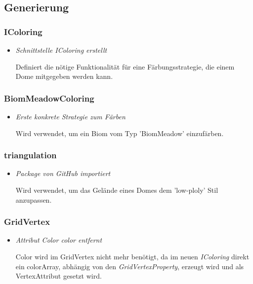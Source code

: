 \subsection{Generierung}

\subsubsection{IColoring}
\begin{itemize}
    \item \textit{Schnittstelle IColoring erstellt}
        \begin{leftbar}[0.9\linewidth]
            Definiert die nötige Funktionalität für eine Färbungsstrategie, die einem Dome mitgegeben werden kann.
        \end{leftbar}
    
\end{itemize}

\subsubsection{BiomMeadowColoring}
\begin{itemize}
    \item \textit{Erste konkrete Strategie zum Färben}
        \begin{leftbar}[0.9\linewidth]
            Wird verwendet, um ein Biom vom Typ 'BiomMeadow' einzufärben.
        \end{leftbar}
    
\end{itemize}

\subsubsection{triangulation}
\begin{itemize}
    \item \textit{Package von GitHub importiert}
        \begin{leftbar}[0.9\linewidth]
            Wird verwendet, um das Gelände eines Domes dem 'low-ploly' Stil anzupassen.
        \end{leftbar}
    
\end{itemize}


\subsubsection{GridVertex}
\begin{itemize}
    \item \textit{Attribut Color color entfernt}
        \begin{leftbar}[0.9\linewidth]
            Color wird im GridVertex nicht mehr benötigt, da im neuen \textit{IColoring} direkt ein colorArray, abhängig
            von den \textit{GridVertexProperty}, erzeugt wird und als VertexAttribut gesetzt wird.
        \end{leftbar}
\end{itemize}

